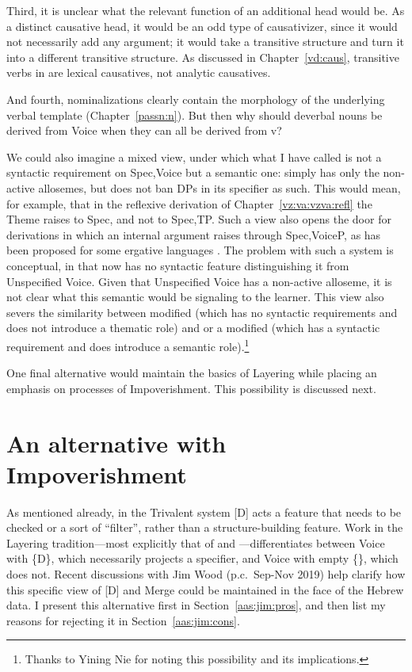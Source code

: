 \begin{exe}
\begin{xlist}
\begin{exe}
\begin{exe}
\begin{xlist}
\begin{exe}
\begin{exe}
\begin{exe}
\begin{exe}
\begin{exe}
\begin{xlist}
\begin{exe}
Third, it is unclear what the relevant function of an additional head would be. As a  distinct causative head, it would be an odd type of causativizer, since it would not necessarily add any argument; it would take a transitive structure and turn it into a different transitive structure. As discussed in Chapter~\ref{vd:caus}, transitive verbs in {\thif} are lexical causatives, not analytic causatives.

And fourth, nominalizations clearly contain the morphology of the underlying verbal template (Chapter~\ref{passn:n}). But then why should deverbal nouns be derived from Voice when they can all be derived from v?

We could also imagine a mixed view, under which what I have called {\vz} is not a syntactic requirement on Spec,Voice but a semantic one: {\vz} simply has only the non-active allosemes, but does not ban DPs in its specifier as such. This would mean, for example, that in the reflexive derivation of Chapter~\ref{vz:va:vzva:refl} the Theme raises to Spec,{\vz} and not to Spec,TP. Such a view also opens the door for derivations in which an internal argument raises through Spec,VoiceP, as has been proposed for some ergative languages \citep{deal19li}. The problem with such a system is conceptual, in that {\vz} now has no syntactic feature distinguishing it from Unspecified Voice. Given that Unspecified Voice has a non-active alloseme, it is not clear what this semantic {\vz} would be signaling to the learner. This view also severs the similarity between modified {\vz} (which has no syntactic requirements and does not introduce a thematic role) and {\pz} or a modified {\pz} (which has a syntactic requirement and does introduce a semantic role).\footnote{Thanks to Yining Nie for noting this possibility and its implications.}

One final alternative would maintain the basics of Layering while placing an emphasis on processes of Impoverishment. This possibility is discussed next.

\section{An alternative with Impoverishment} \label{aas:jim}

\label{r1:g:2c2}As mentioned already, in the Trivalent system [D] acts a feature that needs to be checked or a sort of ``filter'', rather than a structure-building feature. Work in the Layering tradition---most explicitly that of \cite{schaefer08} and \cite{wood15springer}---differentiates between Voice with \{D\}, which necessarily projects a specifier, and Voice with empty \{\}, which does not. Recent discussions with Jim Wood (p.c.~Sep-Nov 2019) help clarify how this specific view of [D] and Merge could be maintained in the face of the Hebrew data. I present this alternative first in Section~\ref{aas:jim:pros}, and then list my reasons for rejecting it in Section~\ref{aas:jim:cons}.


\end{exe}
\end{xlist}
\end{exe}
\end{exe}
\end{exe}
\end{exe}
\end{exe}
\end{xlist}
\end{exe}
\end{exe}
\end{xlist}
\end{exe}
